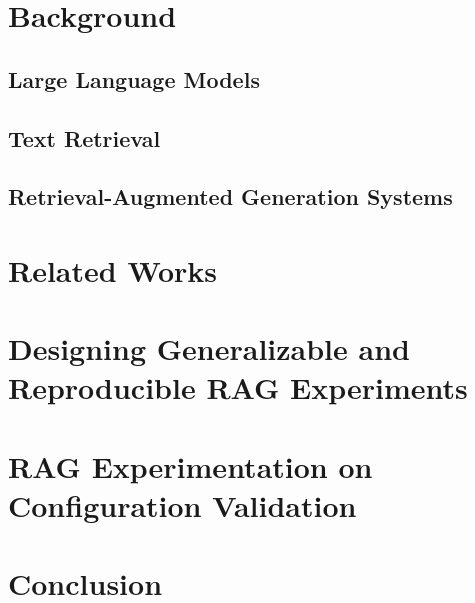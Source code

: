 \documentclass[english,master]{swsLeipzig}
\begin{document}
\chapter{Background}\label{chap:background}


\section{Large Language Models}\label{sec:llm}


\section{Text Retrieval}\label{sec:retrieval}


% 

\section{Retrieval-Augmented Generation Systems}\label{sec:rag}



\chapter{Related Works}\label{chap:relwork}


\chapter{Designing Generalizable and Reproducible RAG Experiments}\label{chap:design}


\chapter{RAG Experimentation on Configuration Validation}\label{chap:Experiment}


\chapter{Conclusion}\label{chap:Conclusion}


\newpage
\appendix



\end{document}

